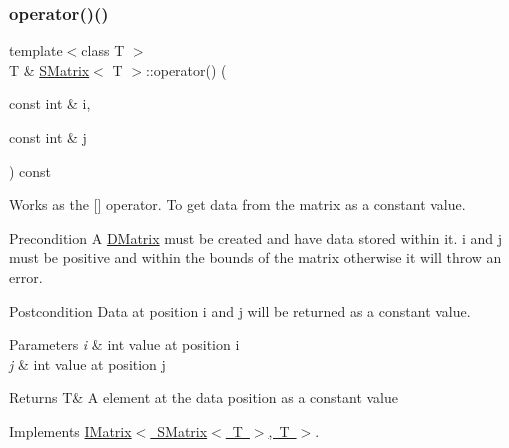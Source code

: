 \mbox{\label{class_s_matrix_a9255f1dbcfefeff621616f8495215c3d}} 
\subsubsection{\texorpdfstring{operator()()}{operator()()}\hspace{0.1cm}{\footnotesize\ttfamily [2/2]}}
{\footnotesize\ttfamily template$<$class T $>$ \\
T \& \mbox{\hyperlink{class_s_matrix}{S\+Matrix}}$<$ T $>$\+::operator() (\begin{DoxyParamCaption}\item[{const int \&}]{i,  }\item[{const int \&}]{j }\end{DoxyParamCaption}) const\hspace{0.3cm}{\ttfamily [virtual]}}



Works as the \mbox{[}\mbox{]} operator. To get data from the matrix as a constant value. 

\begin{DoxyPrecond}{Precondition}
A \mbox{\hyperlink{class_d_matrix}{D\+Matrix}} must be created and have data stored within it. i and j must be positive and within the bounds of the matrix otherwise it will throw an error. 
\end{DoxyPrecond}
\begin{DoxyPostcond}{Postcondition}
Data at position i and j will be returned as a constant value.
\end{DoxyPostcond}

\begin{DoxyParams}{Parameters}
{\em i} & int value at position i \\
\hline
{\em j} & int value at position j \\
\hline
\end{DoxyParams}
\begin{DoxyReturn}{Returns}
T\& A element at the data position as a constant value 
\end{DoxyReturn}


Implements \mbox{\hyperlink{class_i_matrix_a2abf1a0d2454051da3ccf9cacf12797e}{I\+Matrix$<$ S\+Matrix$<$ T $>$, T $>$}}.

\mbox{\label{class_s_matrix_a8cd6e37560a4cb9fd35e9120ed680135}} 
